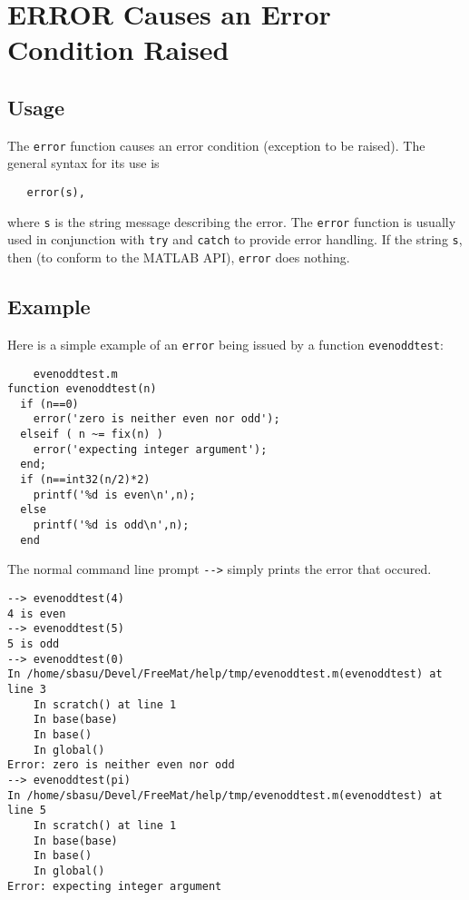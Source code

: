 \section{ERROR Causes an Error Condition Raised}

\subsection{Usage}

The \verb|error| function causes an error condition (exception
to be raised).  The general syntax for its use is
\begin{verbatim}
   error(s),
\end{verbatim}
where \verb|s| is the string message describing the error.  The
\verb|error| function is usually used in conjunction with \verb|try|
and \verb|catch| to provide error handling.  If the string \verb|s|,
then (to conform to the MATLAB API), \verb|error| does nothing.
\subsection{Example}

Here is a simple example of an \verb|error| being issued by a function
\verb|evenoddtest|:
\begin{verbatim}
    evenoddtest.m
function evenoddtest(n)
  if (n==0)
    error('zero is neither even nor odd');
  elseif ( n ~= fix(n) )
    error('expecting integer argument');
  end;
  if (n==int32(n/2)*2)
    printf('%d is even\n',n);
  else
    printf('%d is odd\n',n);
  end
\end{verbatim}
The normal command line prompt \verb|-->| simply prints the error
that occured.
\begin{verbatim}
--> evenoddtest(4)
4 is even
--> evenoddtest(5)
5 is odd
--> evenoddtest(0)
In /home/sbasu/Devel/FreeMat/help/tmp/evenoddtest.m(evenoddtest) at line 3
    In scratch() at line 1
    In base(base)
    In base()
    In global()
Error: zero is neither even nor odd
--> evenoddtest(pi)
In /home/sbasu/Devel/FreeMat/help/tmp/evenoddtest.m(evenoddtest) at line 5
    In scratch() at line 1
    In base(base)
    In base()
    In global()
Error: expecting integer argument
\end{verbatim}

